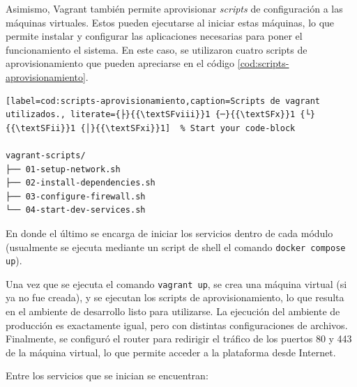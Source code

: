 Asimismo, Vagrant también permite aprovisionar \textit{scripts} de configuración a las máquinas virtuales. Estos pueden ejecutarse al iniciar estas máquinas, lo que permite instalar y configurar las aplicaciones necesarias para poner el funcionamiento el sistema. En este caso, se utilizaron cuatro scripts de aprovisionamiento que pueden apreciarse en el código \ref{cod:scripts-aprovisionamiento}.

\begin{lstlisting}[label=cod:scripts-aprovisionamiento,caption=Scripts de vagrant utilizados., literate={├}{{\textSFviii}}1 {─}{{\textSFx}}1 {└}{{\textSFii}}1 {│}{{\textSFxi}}1]  % Start your code-block

vagrant-scripts/
├── 01-setup-network.sh
├── 02-install-dependencies.sh
├── 03-configure-firewall.sh
└── 04-start-dev-services.sh

\end{lstlisting}

En donde el último se encarga de iniciar los servicios dentro de cada módulo (usualmente se ejecuta mediante un script de shell el comando \texttt{docker compose up}).

Una vez que se ejecuta el comando \texttt{vagrant up}, se crea una máquina virtual (si ya no fue creada), y se ejecutan los scripts de aprovisionamiento, lo que resulta en el ambiente de desarrollo listo para utilizarse. La ejecución del ambiente de producción es exactamente igual, pero con distintas configuraciones de archivos. Finalmente, se configuró el router para redirigir el tráfico de los puertos 80 y 443 de la máquina virtual, lo que permite acceder a la plataforma desde Internet.

Entre los servicios que se inician se encuentran:

